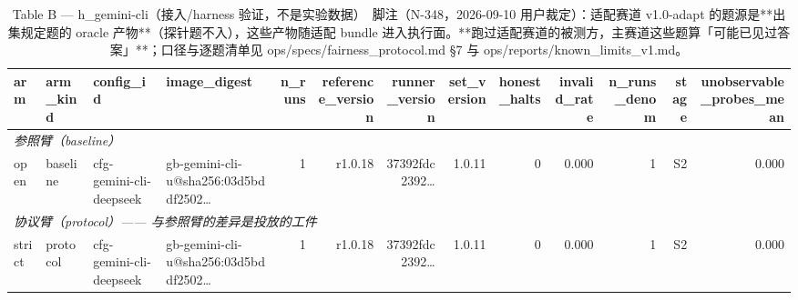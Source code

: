 \begin{table}[t]
\centering
\caption{Table B — h\_gemini-cli（接入/harness 验证，不是实验数据）　脚注（N-348，2026-09-10 用户裁定）：适配赛道 v1.0-adapt 的题源是**出集规定题的 oracle 产物**（探针题不入），这些产物随适配 bundle 进入执行面。**跑过适配赛道的被测方，主赛道这些题算「可能已见过答案」**；口径与逐题清单见 ops/specs/fairness\_protocol.md §7 与 ops/reports/known\_limits\_v1.md。}
\label{tab:b-h_gemini-cli}
\begin{tabular}{llllrrrrrrrrr}
\toprule
arm & arm\_kind & config\_id & image\_digest & n\_runs & reference\_version & runner\_version & set\_version & honest\_halts & invalid\_rate & n\_runs\_denom & stage & unobservable\_probes\_mean \\
\midrule
\multicolumn{13}{l}{\textit{参照臂（baseline）}} \\
open & baseline & cfg-gemini-cli-deepseek & gb-gemini-cli-u@sha256:03d5bddf2502… & 1 & r1.0.18 & 37392fdc2392… & 1.0.11 & 0 & 0.000 & 1 & S2 & 0.000 \\
\midrule
\multicolumn{13}{l}{\textit{协议臂（protocol）—— 与参照臂的差异是投放的工件}} \\
strict & protocol & cfg-gemini-cli-deepseek & gb-gemini-cli-u@sha256:03d5bddf2502… & 1 & r1.0.18 & 37392fdc2392… & 1.0.11 & 0 & 0.000 & 1 & S2 & 0.000 \\
\bottomrule
\end{tabular}
\end{table}

